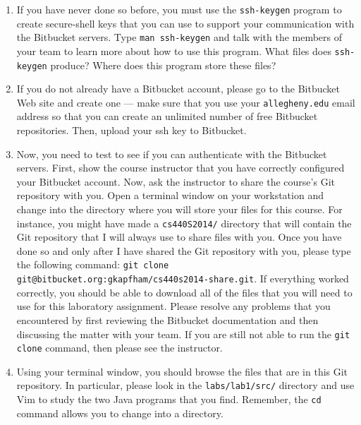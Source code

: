 \begin{enumerate}
	
  \item If you have never done so before, you must use the {\tt ssh-keygen} program to create secure-shell keys that you
    can use to support your communication with the Bitbucket servers.  Type {\tt man ssh-keygen} and talk with the
    members of your team to learn more about how to use this program.  What files does {\tt ssh-keygen} produce?  Where
    does this program store these files?

  \item If you do not already have a Bitbucket account, please go to the Bitbucket Web site and create one --- 
    make sure that you use your {\tt allegheny.edu} email address so that you can create an unlimited number of free
    Bitbucket repositories. Then, upload your ssh key to Bitbucket.

  \item Now, you need to test to see if you can authenticate with the Bitbucket servers.  First, show the course instructor that
    you have correctly configured your Bitbucket account.  Now, ask the instructor to share the course's Git repository with you.
    Open a terminal window on your workstation and change into the directory where you will store your files for this course.  For
    instance, you might have made a {\tt cs440S2014/} directory that will contain the Git repository that I will always use to
    share files with you.  Once you have done so and only after I have shared the Git repository with you, please type the
    following command: {\tt git clone git@bitbucket.org:gkapfham/cs440s2014-share.git}.  If everything worked correctly, you
    should be able to download all of the files that you will need to use for this laboratory assignment. Please resolve any
    problems that you encountered by first reviewing the Bitbucket documentation and then discussing the matter with your team. If
    you are still not able to run the {\tt git clone} command, then please see the instructor.

  \item Using your terminal window, you should browse the files that are in this Git repository.  In particular, please
    look in the {\tt labs/lab1/src/} directory and use Vim to study the two Java programs that you find.  Remember, the
    {\tt cd} command allows you to change into a directory. 

\end{enumerate}


